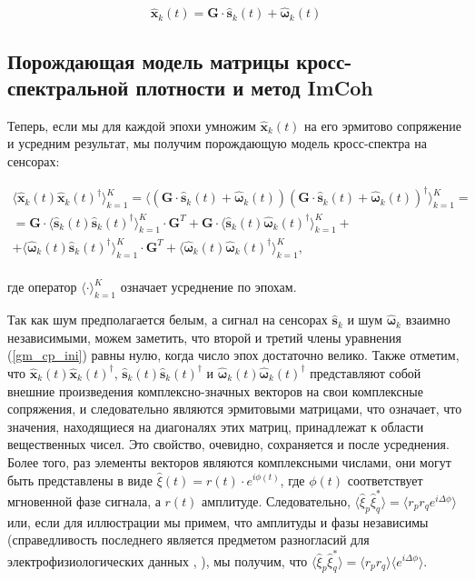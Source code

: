 \begin{equation}
    \hat{\mathbf{x}}_k(t) = \mathbf{G} \cdot \hat{\mathbf{s}}_k(t) + \hat{\mathbf{\omega}}_k(t)
    \label{gm_timefreq_no_fi}
\end{equation}

\subsection{Порождающая модель матрицы кросс-спектральной плотности и метод ImCoh}\label{sec:imcoh}
Теперь, если мы для каждой эпохи умножим $\hat{\mathbf{x}}_k(t)$ на его эрмитово сопряжение и усредним результат,
мы получим порождающую модель кросс-спектра на сенсорах:

\begin{gather}
           \langle{\hat{\mathbf{x}}_k(t) \hat{\mathbf{x}}_k(t)^{\dag}} \rangle_{k=1}^K =
           \langle{(\mathbf{G} \cdot\hat{\mathbf{s}}_k(t) + \hat{\mathbf{\omega}}_k(t))
                                       (\mathbf{G} \cdot\hat{\mathbf{s}}_k(t) + \hat{\mathbf{\omega}}_k(t))^{\dag}}\rangle_{k=1}^K=\nonumber\\
= \mathbf{G}  \cdot \langle{\hat{\mathbf{s     }}_k(t) \hat{\mathbf{s     }}_k(t)^{\dag}} \rangle_{k=1}^K \cdot \mathbf{G}^T +
   \mathbf{G} \cdot \langle{\hat{\mathbf{s     }}_k(t) \hat{\mathbf{\omega}}_k(t)^{\dag}} \rangle_{k=1}^K + \nonumber\\
        +  \langle{\hat{\mathbf{\omega}}_k(t) \hat{\mathbf{s     }}_k(t)^{\dag}} \rangle_{k=1}^K \cdot \mathbf{G}^T +
           \langle{\hat{\mathbf{\omega}}_k(t) \hat{\mathbf{\omega}}_k(t)^{\dag}} \rangle_{k=1}^K,
    \label{gm_cp_ini}
\end{gather}
\\
где оператор $\langle \cdot \rangle_{k=1}^K$ означает усреднение по эпохам.

Так как шум предполагается белым, а сигнал на сенсорах $\hat{\mathbf{s}}_k$ и шум $\hat{\mathbf{\omega}}_k$ взаимно независимыми,
можем заметить, что второй и третий члены уравнения (\ref{gm_cp_ini}) равны нулю, когда число эпох достаточно велико.
Также отметим, что
$\hat{\mathbf{x     }}_k(t) \hat{\mathbf{x     }}_k(t)^{\dag}$,
$\hat{\mathbf{s     }}_k(t) \hat{\mathbf{s     }}_k(t)^{\dag}$ и
$\hat{\mathbf{\omega}}_k(t) \hat{\mathbf{\omega}}_k(t)^{\dag}$
представляют собой внешние произведения комплексно-значных векторов на свои комплексные сопряжения,
и следовательно являются эрмитовыми матрицами, что означает,
что значения, находящиеся на диагоналях этих матриц, принадлежат к области вещественных чисел.
Это свойство, очевидно, сохраняется и после усреднения.
Более того, раз элементы векторов являются комплексными числами, они могут быть представлены в виде
$\hat{\xi}(t) = r(t)\cdot e^{i\phi(t)}$, где $\phi(t)$ соответствует мгновенной фазе сигнала,
а $r(t)$ амплитуде. Следовательно,
$\langle \hat{\xi}_p \hat{\xi}_q^* \rangle = \langle r_p r_q e^{i\Delta\phi} \rangle$ или,
если для иллюстрации мы примем, что амплитуды и фазы независимы
(справедливость последнего является предметом разногласий для электрофизиологических данных \cite{Lachaux1999}, \cite{imcoh}),
мы получим, что
$\langle \hat{\xi}_p \hat{\xi}_q^* \rangle = \langle r_p r_q \rangle \langle e^{i\Delta\phi} \rangle$.

